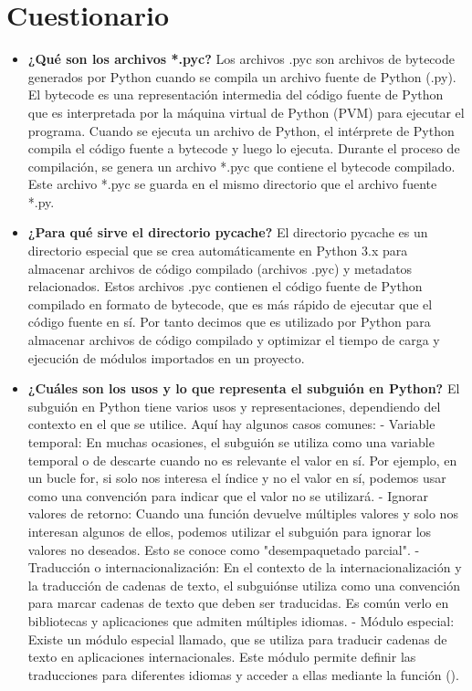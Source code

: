 \documentclass{article}
\begin{document}
\section{Cuestionario}
	\begin{itemize}
		\item \textbf{¿Qué son los archivos *.pyc?}
  \newline
Los archivos .pyc son archivos de bytecode generados por Python cuando se compila un archivo fuente de Python (.py). El bytecode es una representación intermedia del código fuente de Python que es interpretada por la máquina virtual de Python (PVM) para ejecutar el programa.
Cuando se ejecuta un archivo de Python, el intérprete de Python compila el código fuente a bytecode y luego lo ejecuta. Durante el proceso de compilación, se genera un archivo *.pyc que contiene el bytecode compilado. Este archivo *.pyc se guarda en el mismo directorio que el archivo fuente *.py.
		\item \textbf{¿Para qué sirve el directorio pycache?}
  \newline
  El directorio pycache es un directorio especial que se crea automáticamente en Python 3.x para almacenar archivos de código compilado (archivos .pyc) y metadatos relacionados. Estos archivos .pyc contienen el código fuente de Python compilado en formato de bytecode, que es más rápido de ejecutar que el código fuente en sí.
  Por tanto decimos que es utilizado por Python para almacenar archivos de código compilado y optimizar el tiempo de carga y ejecución de módulos importados en un proyecto.
		\item \textbf{¿Cuáles son los usos y lo que representa el subguión en Python?}
  \newline
  El subguión en Python tiene varios usos y representaciones, dependiendo del contexto en el que se utilice. Aquí hay algunos casos comunes:
    - Variable temporal: En muchas ocasiones, el subguión se utiliza como una variable temporal o de descarte cuando no es relevante el valor en sí. Por ejemplo, en un bucle for, si solo nos interesa el índice y no el valor en sí, podemos usar como una convención para indicar que el valor no se utilizará.\newline
    - Ignorar valores de retorno: Cuando una función devuelve múltiples valores y solo nos interesan algunos de ellos, podemos utilizar el subguión para ignorar los valores no deseados. Esto se conoce como "desempaquetado parcial".\newline
    - Traducción o internacionalización: En el contexto de la internacionalización y la traducción de cadenas de texto, el subguiónse utiliza como una convención para marcar cadenas de texto que deben ser traducidas. Es común verlo en bibliotecas y aplicaciones que admiten múltiples idiomas.\newline
    - Módulo especial: Existe un módulo especial llamado, que se utiliza para traducir cadenas de texto en aplicaciones internacionales. Este módulo permite definir las traducciones para diferentes idiomas y acceder a ellas mediante la función ().
	\end{itemize}	
\end{document}
